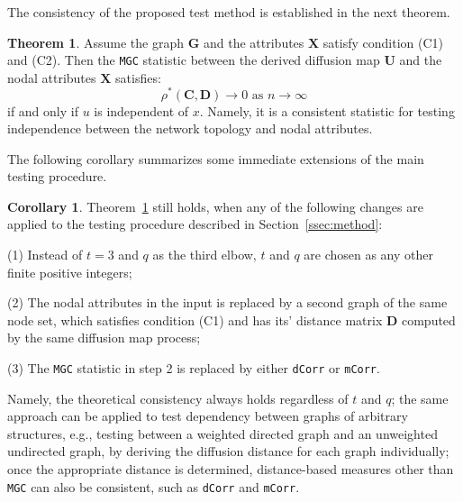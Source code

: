 \documentclass[11pt]{article}
\theoremstyle{definition}
\newtheorem{theorem}{Theorem}
\newtheorem{corollary}{Corollary}
\begin{document}
The consistency of the proposed test method is established in the next theorem.

\begin{theorem}
Assume the graph $\mathbf{G}$ and the attributes $\mathbf{X}$ satisfy condition (C1) and (C2). Then the \texttt{MGC} statistic between the derived diffusion map $\mathbf{U}$ and the nodal attributes $\mathbf{X}$ satisfies:
\begin{equation}
\rho^{*}(\mathbf{C}, \mathbf{D}) \longrightarrow 0 \mbox{ as } n \rightarrow \infty
\end{equation}
if and only if $u$ is independent of $x$. Namely, it is a consistent statistic for testing independence between the network topology and nodal attributes.
	\label{theoremMain}
\end{theorem} 

The following corollary summarizes some immediate extensions of the main testing procedure.

\begin{corollary}
\label{main_corollary}
Theorem~\ref{theoremMain} still holds, when any of the following changes are applied to the testing procedure described in Section~\ref{ssec:method}:
\begin{description}[align=left]
\item [] (1) Instead of $t=3$ and $q$ as the third elbow, $t$ and $q$ are chosen as any other finite positive integers;

\item [] (2) The nodal attributes in the input is replaced by a second graph of the same node set, which satisfies condition (C1) and has its' distance matrix $\mathbf{D}$ computed by the same diffusion map process;

\item [] (3) The \texttt{MGC} statistic in step 2 is replaced by either \texttt{dCorr} or \texttt{mCorr}.
\end{description}
\end{corollary}

Namely, the theoretical consistency always holds regardless of $t$ and $q$; the same approach can be applied to test dependency between graphs of arbitrary structures, e.g., testing between a weighted directed graph and an unweighted undirected graph, by deriving the diffusion distance for each graph individually; once the appropriate distance is determined, distance-based measures other than \texttt{MGC} can also be consistent, such as \texttt{dCorr} and \texttt{mCorr}. 
\end{document}
